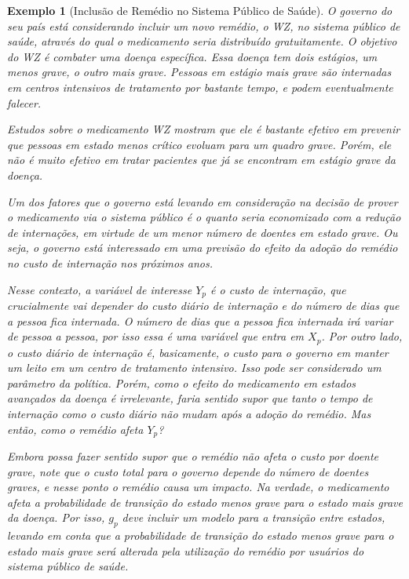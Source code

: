 \documentclass[12pt]{article}
\theoremstyle{break}
\newtheorem{exemplo}{Exemplo}
\begin{document}
\begin{exemplo}[Inclusão de Remédio no Sistema Público de Saúde]
\label{ex:sick_sicker}
O governo do seu país está considerando incluir um novo remédio, o WZ, no sistema público de saúde,  através do qual o medicamento seria distribuído gratuitamente. O objetivo do WZ é combater uma doença específica. Essa doença tem dois estágios, um menos grave, o outro mais grave. Pessoas em estágio mais grave são internadas em centros intensivos de tratamento por bastante tempo, e podem eventualmente falecer. 

Estudos sobre o medicamento WZ mostram que ele é bastante efetivo em prevenir que  pessoas em estado menos crítico evoluam para um quadro grave. Porém, ele não é muito efetivo em tratar pacientes que já se encontram em estágio grave da doença.

Um dos fatores que o governo está levando em consideração na decisão de  prover o medicamento via o sistema público é o quanto seria economizado com a redução de internações, em virtude de um menor número de doentes em estado grave. Ou seja, o governo está interessado em uma previsão do efeito da adoção do remédio no custo de internação nos próximos anos. 

Nesse contexto, a variável de interesse $Y_p$ é o custo de internação, que crucialmente vai depender do custo diário de internação e do número de dias que a pessoa fica internada. O número de dias que a pessoa fica internada irá variar de pessoa a pessoa, por isso essa é uma variável que entra em $X_p$. Por outro lado, o custo diário de internação é, basicamente, o custo para o governo em manter um leito em um centro de tratamento intensivo. Isso pode ser considerado um parâmetro da política. Porém, como o efeito do medicamento em estados avançados da doença é irrelevante, faria sentido supor que tanto o tempo de internação como o custo diário não mudam após a adoção do remédio. Mas então, como o remédio afeta $Y_p$?

Embora possa fazer sentido supor que o remédio não afeta o custo por doente grave, note que o custo total para o governo depende do número de doentes graves, e nesse ponto o remédio causa um impacto. Na verdade, o medicamento afeta a probabilidade de transição do estado menos grave para o estado mais grave da doença. Por isso, $g_p$ deve incluir um modelo para a transição entre estados, levando em conta que a probabilidade de transição do estado menos grave para o estado mais grave será alterada pela utilização do remédio por usuários do sistema público de saúde. 


\end{exemplo}
\end{document}
